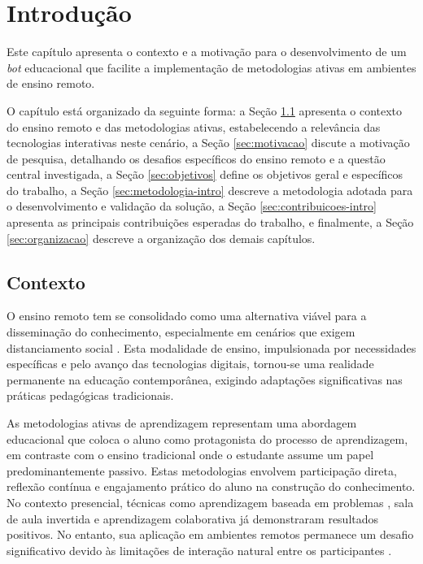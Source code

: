 \chapter{Introdução}
\label{cap:intro}

Este capítulo apresenta o contexto e a motivação para o desenvolvimento de um
\textit{bot} educacional que facilite a implementação de metodologias ativas em
ambientes de ensino remoto.

O capítulo está organizado da seguinte forma: a Seção \ref{sec:contexto-intro}
apresenta o contexto do ensino remoto e das metodologias ativas, estabelecendo
a relevância das tecnologias interativas neste cenário, a Seção
\ref{sec:motivacao} discute a motivação de pesquisa, detalhando os
desafios específicos do ensino remoto e a questão central investigada, a Seção
\ref{sec:objetivos} define os objetivos geral e específicos do trabalho, a Seção
\ref{sec:metodologia-intro} descreve a metodologia adotada para o desenvolvimento
e validação da solução, a Seção \ref{sec:contribuicoes-intro} apresenta as
principais contribuições esperadas do trabalho, e finalmente, a Seção
\ref{sec:organizacao} descreve a organização dos demais capítulos.

\section{Contexto}
\label{sec:contexto-intro}

O ensino remoto tem se consolidado como uma alternativa viável para a
disseminação do conhecimento, especialmente em cenários que exigem
distanciamento social \cite{fabiane2024}. Esta modalidade de ensino,
impulsionada por necessidades específicas e pelo avanço das tecnologias
digitais, tornou-se uma realidade permanente na educação contemporânea, exigindo
adaptações significativas nas práticas pedagógicas tradicionais.

As metodologias ativas de aprendizagem \cite{prince2004} representam uma
abordagem educacional que coloca o aluno como protagonista do processo de
aprendizagem, em contraste com o ensino tradicional onde o estudante assume um
papel predominantemente passivo. Estas metodologias envolvem participação
direta, reflexão contínua e engajamento prático do aluno na construção do
conhecimento. No contexto presencial, técnicas como aprendizagem baseada em
problemas \cite{yew2016}, sala de aula invertida \cite{vanalten2019} e
aprendizagem colaborativa \cite{laal2012} já demonstraram resultados positivos.
No entanto, sua aplicação em ambientes remotos permanece um desafio
significativo devido às limitações de interação natural entre os participantes
\cite{fabiane2024}.

